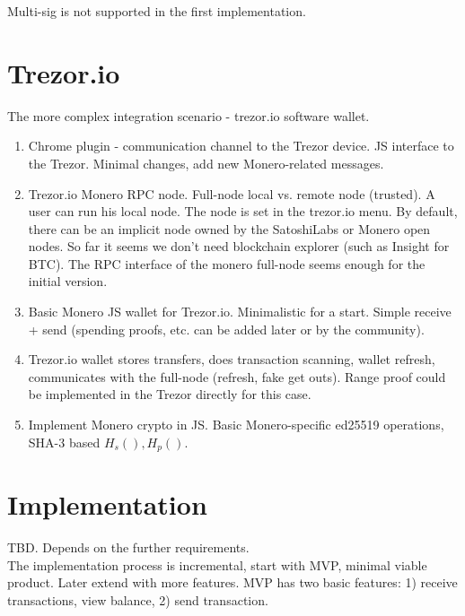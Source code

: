 \documentclass[]{article}
\begin{document}
Multi-sig is not supported in the first implementation.

\section{Trezor.io}

The more complex integration scenario - trezor.io software wallet.
\begin{enumerate}
	\item Chrome plugin - communication channel to the Trezor device. 
	JS interface to the Trezor. Minimal changes, add new Monero-related messages.
	
	\item Trezor.io Monero RPC node. Full-node local vs. remote node (trusted). A user can run his local node. The node is set in the trezor.io menu. By default, there can be an implicit node owned by the SatoshiLabs or Monero open nodes. So far it seems we don't need blockchain explorer (such as Insight for BTC). The RPC interface of the monero full-node seems enough for the initial version.
	
	\item Basic Monero JS wallet for Trezor.io. Minimalistic for a start. Simple receive + send (spending proofs, etc. can be added later or by the community). 
	
	\item Trezor.io wallet stores transfers, does transaction scanning, wallet refresh, communicates with the full-node (refresh, fake get outs). Range proof could be implemented in the Trezor directly for this case. 
	
	\item Implement Monero crypto in JS. Basic Monero-specific ed25519 operations, SHA-3 based $H_s(), H_p()$.
	
\end{enumerate}


\section{Implementation}


\noindent TBD. Depends on the further requirements.\\

The implementation process is incremental, start with MVP, minimal viable product. Later extend with more features. MVP has two basic features: 1) receive transactions, view balance, 2) send transaction. 
\end{document}
